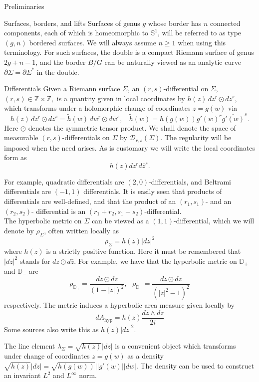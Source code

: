 \documentclass[12pt]{amsart}
\newcommand{\disk}{\ensuremath{\mathbb{D}} } %
\newcommand{\riem}{\Sigma}  %
\theoremstyle{plain}
\theoremstyle{definition}
\theoremstyle{remark}
\numberwithin{equation}{section} %
\numberwithin{figure}{section} %
\begin{document}
\begin{section}{Preliminaries}
\begin{subsection}{Surfaces, borders, and lifts}
  Surfaces of genus $g$ whose border has $n$ connected components, each of which is homeomorphic to $\mathbb{S}^1$, will be referred to as type $(g,n)$ bordered surfaces. We will always assume $n \geq 1$ when using this terminology. For such surfaces, the double is a compact Riemann surface of genus $2g+n-1$, and the border $B/G$ can be naturally viewed as an analytic curve $\partial \riem = \partial \riem^*$ in the double.
\end{subsection}
\begin{subsection}{Differentials}  
 {Given a Riemann surface $\riem$, an $(r,s)$-differential on $\riem$, $(r,s)\in \mathbb{Z}\times \mathbb{Z},$} is a quantity given in local coordinates by $h(z)\, dz^r \odot d\bar{z}^s$, which transforms under a holomorphic change of coordinates $z=g(w)$ via 
 \[  h(z)\, dz^r \odot d\bar{z}^s = \tilde{h}(w)\, dw^r \odot d\bar{w}^s, \ \ \ \ \tilde{h}(w) =  h(g(w)) g'(w)^r \overline{g'(w)}^s.   \]
 Here $\odot$ denotes the symmetric tensor product. We shall denote the space of measurable $(r,s)$-differentials on $\riem$ by $\mathscr{D}_{r,s}(\riem).$
 The regularity will be imposed when the need arises. 
 As is customary we will write the local coordinates form as 
 \[   h(z) dz^r d\bar{z}^s.   \]
 

 
 For example, quadratic differentials are $(2,0)$-differentials, and Beltrami differentials are $(-1,1)$ differentials. It is easily seen that products of differentials are well-defined, and that the product of an $(r_1,s_1)$- and an $(r_2,s_2)$- differential is an $(r_1+r_2,s_1+s_2)$-differential.  \\

 

 The hyperbolic metric on $\riem$ can be viewed as a $(1,1)$-differential, which we will denote by $\rho_\riem$, often written locally as 
 \[ \rho_\riem=  h(z) |dz|^2 \] 
 where $h(z)$ is a strictly positive function. Here it must be remembered that $|dz|^2$ stands for $dz\odot d\bar{z}$.   For example, we have that the hyperbolic metric on $\disk_+$ and $\disk_-$ are 
 \[  \rho_{\disk_+} = \frac{d\bar{z} \odot dz }{(1-|z|)^2}, \ \ \   \rho_{\disk_-} = \frac{d\bar{z} \odot dz }{(|z|^2-1)^2} \]
 respectively.  The metric induces a hyperbolic area measure given locally by
 \[  dA_{\mathrm{hyp}} = h(z) \frac{d\bar{z} \wedge dz}{2i}   \]
 Some sources also write this as $h(z) |dz|^2$.  
 
 
 The line element $\lambda_\riem = \sqrt{h(z)} |dz|$ is a convenient object which transforms under change of coordinates $z=g(w)$ as a density $\sqrt{h(z)}|dz|=\sqrt{h(g(w))}||g'(w)||dw|$. 
 The density can be used to construct an invariant $L^2$ and $L^\infty$ norm.\\


\end{subsection}
\end{section}
\end{document}
